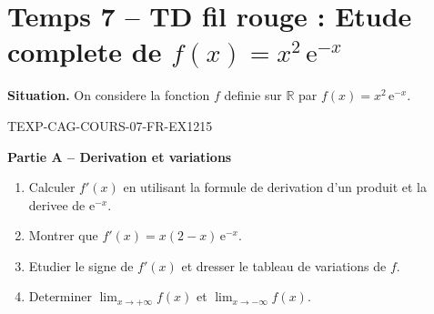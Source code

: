 

\section*{Temps 7 -- TD fil rouge : Etude complete de $f(x) = x^2\,\mathrm{e}^{-x}$}

\textbf{Situation.} On considere la fonction $f$ definie sur $\mathbb{R}$ par $f(x) = x^2\,\mathrm{e}^{-x}$.

\bigskip


\begin{exercice}{TEXP-CAG-COURS-07-FR-EX1}{2}{15}

\textbf{Partie A -- Derivation et variations}

\begin{enumerate}
  \item Calculer $f'(x)$ en utilisant la formule de derivation d'un produit et la derivee de $\mathrm{e}^{-x}$.
  \item Montrer que $f'(x) = x(2-x)\,\mathrm{e}^{-x}$.
  \item Etudier le signe de $f'(x)$ et dresser le tableau de variations de $f$.
  \item Determiner $\lim_{x \to +\infty} f(x)$ et $\lim_{x \to -\infty} f(x)$.
\end{enumerate}

\end{exercice}

